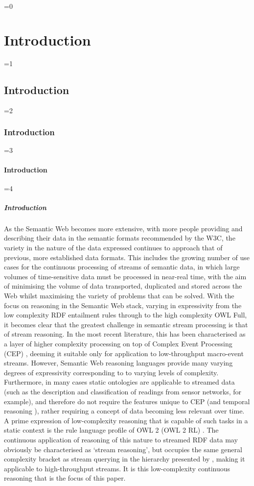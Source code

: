 \documentclass[twocolumn,preprint,3p,number]{elsarticle}
\theoremstyle{plain}
\theoremstyle{definition}
\newcounter{nestingdepth}
\newenvironment{nestedsection}[2]{
  \ifnum\value{nestingdepth}=0
    \chapter{#1}
  \else
    \ifnum\value{nestingdepth}=1
      \section{#1}
    \else
      \ifnum\value{nestingdepth}=2
        \subsection{#1}
      \else
        \ifnum\value{nestingdepth}=3
          \subsubsection{#1}
        \else
          \ifnum\value{nestingdepth}=4
            \paragraph{#1}
          \else
            \PackageError{nestedsections}{Maximum nesting level exceeded!}{uh oh!}
          \fi
        \fi
      \fi
    \fi
  \fi
  \addtocounter{nestingdepth}{1}
  \label{sec:#2}
}{\addtocounter{nestingdepth}{-1}}
\begin{document}
\begin{nestedsection}{Introduction}{intro}
  As the Semantic Web becomes more extensive, with more people providing and describing their data in the semantic formats recommended by the W3C, the variety in the nature of the data expressed continues to approach that of previous, more established data formats.
  This includes the growing number of use cases for the continuous processing of streams of semantic data, in which large volumes of time-sensitive data must be processed in near-real time, with the aim of minimising the volume of data transported, duplicated and stored across the Web whilst maximising the variety of problems that can be solved.
  With the focus on reasoning in the Semantic Web stack, varying in expressivity from the low complexity RDF entailment rules through to the high complexity OWL Full, it becomes clear that the greatest challenge in semantic stream processing is that of stream reasoning.
  In the most recent literature, this has been characterised as a layer of higher complexity processing on top of Complex Event Processing (CEP) \citep{mileo15webSR}, deeming it suitable only for application to low-throughput macro-event streams.
  However, Semantic Web reasoning languages provide many varying degrees of expressivity corresponding to to varying levels of complexity.
  Furthermore, in many cases static ontologies are applicable to streamed data (such as the description and classification of readings from sensor networks, for example), and therefore do not require the features unique to CEP (and temporal reasoning \citep{OrgunWadge92,Tuzhilin93}), rather requiring a concept of data becoming less relevant over time.
  A prime expression of low-complexity reasoning that is capable of such tasks in a static context is the rule language profile of OWL 2 (OWL 2 RL) \citep{w3cowl2profiles}.
  The continuous application of reasoning of this nature to streamed RDF data may obviously be characterised as `stream reasoning', but occupies the same general complexity bracket as stream querying in the hierarchy presented by \citep{mileo15webSR}, making it applicable to high-throughput streams.
  It is this low-complexity continuous reasoning that is the focus of this paper.
  

\end{nestedsection}
\end{document}
